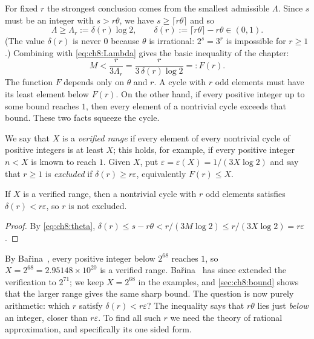 For fixed $r$ the strongest conclusion comes from the smallest admissible
$\Lambda$. Since $s$ must be an integer with $s>r\theta$, we have
$s\geq\lceil r\theta\rceil$ and so
\begin{equation}\label{eq:ch8:Lambdar}
  \Lambda\geq\Lambda_r:=\delta(r)\log2,\qquad
  \delta(r):=\lceil r\theta\rceil-r\theta\in(0,1).
\end{equation}
(The value $\delta(r)$ is never $0$ because $\theta$ is irrational: $2^s=3^r$
is impossible for $r\geq1$.) Combining with \eqref{eq:ch8:Lambda} gives the
basic inequality of the chapter:
\begin{equation}\label{eq:ch8:maxM}
  M<\frac{r}{3\Lambda_r}=\frac{r}{3\,\delta(r)\log2}=:F(r).
\end{equation}
The function $F$ depends only on $\theta$ and $r$. A cycle with $r$ odd
elements must have its least element below $F(r)$. On the other hand, if
every positive integer up to some bound reaches $1$, then every element of a
nontrivial cycle exceeds that bound. These two facts squeeze the cycle.

\begin{definition}\label{def:ch8:excl}
We say that $X$ is a \emph{verified range} if every element of every
nontrivial cycle of positive integers is at least $X$; this holds, for
example, if every positive integer $n<X$ is known to reach $1$. Given $X$, put
$\varepsilon=\varepsilon(X)=1/(3X\log2)$ and say that $r\geq1$ is
\emph{excluded} if $\delta(r)\geq r\varepsilon$, equivalently $F(r)\leq X$.
\end{definition}

\begin{corollary}\label{cor:ch8:excl}
If $X$ is a verified range, then a nontrivial cycle with $r$ odd elements
satisfies $\delta(r)<r\varepsilon$, so $r$ is not excluded.
\end{corollary}

\begin{proof}
By \eqref{eq:ch8:theta}, $\delta(r)\leq s-r\theta<r/(3M\log2)\leq
r/(3X\log2)=r\varepsilon$.
\end{proof}

By Ba\v{r}ina~\cite{barina2021}, every positive integer below $2^{68}$
reaches $1$, so $X=2^{68}=2.95148\times10^{20}$ is a verified range. Ba\v{r}ina~\cite{barina2025} has since extended the verification to $2^{71}$; we keep $X=2^{68}$ in the examples, and \cref{sec:ch8:bound} shows that the larger range gives the same sharp bound. The
question is now purely arithmetic: which $r$ satisfy $\delta(r)<r\varepsilon$?
The inequality says that $r\theta$ lies just \emph{below} an integer, closer
than $r\varepsilon$. To find all such $r$ we need the theory of rational
approximation, and specifically its one sided form.

